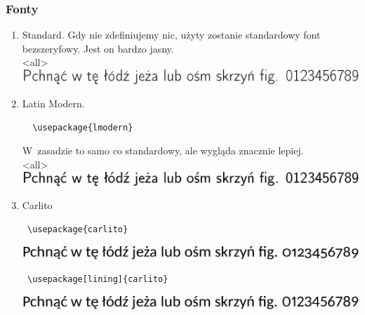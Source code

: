 \begin{frame}
 \frametitle<presentation>{Fonty}
 \hypertarget{fonty}{\null}
 \begin{enumerate}
  \item Standard.
        Gdy nie zdefiniujemy nic, użyty zostanie standardowy font bezszeryfowy. Jest on bardzo jasny.\\<all>
        \includegraphics[width=.8\textwidth]{default}
  \item Latin Modern.
        \begin{lstlisting}
  \usepackage{lmodern}
  \end{lstlisting}
        W~zasadzie to samo co standardowy, ale wygląda znacznie lepiej.\\<all>
        \includegraphics[width=.8\textwidth]{lmodern}
  \item Carlito 
        \begin{lstlisting}
 \usepackage{carlito}
\end{lstlisting}
        \includegraphics[width=.8\textwidth]{carlito}
        \begin{lstlisting}
 \usepackage[lining]{carlito}
\end{lstlisting}
        \includegraphics[width=.8\textwidth]{carlito_lining}


\end{enumerate}
\end{frame}
